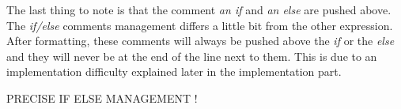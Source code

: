 The last thing to note is that the comment \emph{an if} and \emph{an else} are pushed above. The \emph{if/else} comments management differs a little bit from the other expression. After formatting, these comments will always be pushed above the \textit{if} or the \emph{else} and they will never be at the end of the line next to them. This is due to an implementation difficulty explained later in the implementation part.


PRECISE IF ELSE MANAGEMENT !




